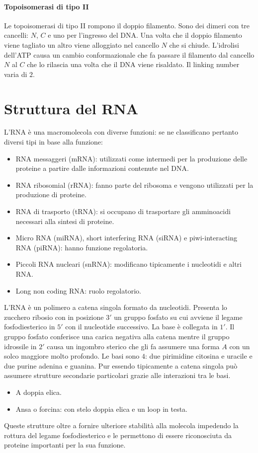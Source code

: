 \paragraph{Topoisomerasi di tipo II}
Le topoisomerasi di tipo II rompono il doppio filamento. Sono dei dimeri con tre cancelli: $N$, $C$ e uno per l'ingresso del DNA. Una volta che il doppio filamento viene tagliato un
altro viene alloggiato nel cancello $N$ che si chiude. L'idrolisi dell'ATP causa un cambio conformazionale che fa passare il filamento dal cancello $N$ al $C$ che lo rilascia una volta
che il DNA viene risaldato. Il linking number varia di $2$. 
\section{Struttura del RNA}
L'RNA \`e una macromolecola con diverse funzioni: se ne classificano pertanto diversi tipi in base alla funzione:
\begin{itemize}
	\item RNA messaggeri (mRNA): utilizzati come intermedi per la produzione delle proteine a partire dalle informazioni contenute nel DNA.
	\item RNA ribosomial (rRNA): fanno parte del ribosoma e vengono utilizzati per la produzione di proteine.
	\item RNA di trasporto (tRNA): si occupano di trasportare gli amminoacidi necessari alla sintesi di proteine.
	\item Micro RNA (miRNA), short interfering RNA (siRNA) e piwi-interacting RNA (piRNA): hanno funzione regolatoria.
	\item Piccoli RNA nucleari (snRNA): modificano tipicamente i nucleotidi e altri RNA.
	\item Long non coding RNA: ruolo regolatorio. 
\end{itemize}
L'RNA \`e un polimero a catena singola formato da nucleotidi. Presenta lo zucchero ribosio con in posizione $3'$ un gruppo fosfato su cui avviene il legame fosfodiesterico in $5'$ con il
nucleotide successivo. La base \`e collegata in $1'$. Il gruppo fosfato conferisce una carica negativa alla catena mentre il gruppo idrossile in $2'$ causa un ingombro sterico 
che gli fa assumere una forma $A$ con un solco maggiore molto profondo. Le basi sono $4$: due pirimidine citosina e uracile e due purine adenina e guanina. 
Pur essendo tipicamente a catena singola pu\`o assumere strutture secondarie particolari grazie alle interazioni tra le basi. 
\begin{itemize}
	\item A doppia elica.
	\item Ansa o forcina: con stelo doppia elica e un loop in testa.
\end{itemize}
Queste strutture oltre a fornire ulteriore stabilit\`a alla molecola impedendo la rottura del legame fosfodiesterico e le permettono di essere riconosciuta da proteine importanti per la 
sua funzione. 
